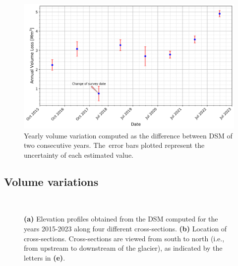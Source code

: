 \begin{figure}[ht]
    \centering
    \includegraphics[width=0.9\columnwidth]{volume_loss_2015-2023.png}
    \caption{Yearly volume variation computed as the difference between DSM of two
        consecutive years. The~error bars plotted represent the uncertainty of each
        estimated value.}
    \label{fig:3:volumes}
\end{figure}

\subsection{Volume variations}\label{sec:3:res:volumes}

\begin{figure}[p]
  \centering
     \\
    \caption{\textbf{(a)} Elevation profiles obtained from the DSM computed for the years 2015-2023 along four different cross-sections. \textbf{(b)} Location of cross-sections. Cross-sections are viewed from south to north (i.e., from upstream to downstream of the glacier), as indicated by the letters in \textbf{(e)}.}
    \label{fig:3:profiles}
\end{figure}

